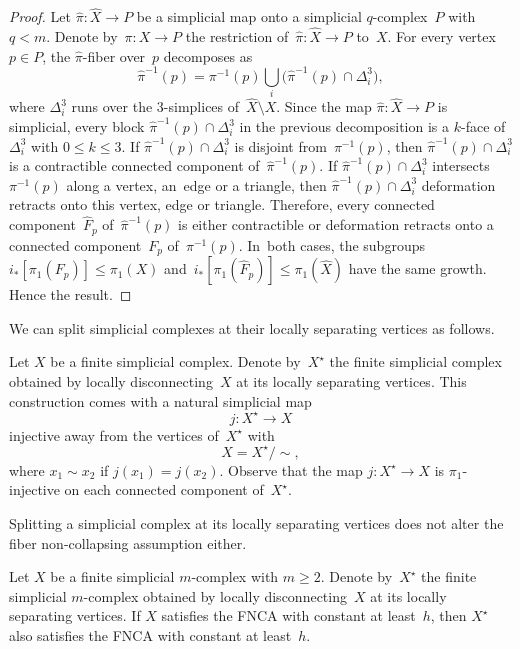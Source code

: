 \begin{proof}
Let $\widehat{\pi}:\widehat{X} \to P$ be a simplicial map onto a simplicial $q$-complex~$P$ with $q < m$.
Denote by~$\pi:X \to P$ the restriction of~$\widehat{\pi}:\widehat{X} \to P$ to~$X$.
For every vertex $p \in P$, the $\widehat{\pi}$-fiber over~$p$ decomposes as
\[
\widehat{\pi}^{-1}(p) = \pi^{-1}(p) \bigcup_i \bigl(\widehat{\pi}^{-1}(p) \cap \Delta_i^3 \bigr),
\]
where $\Delta_i^3$ runs over the $3$-simplices of~$\widehat{X} \setminus X$.
Since the map $\widehat{\pi}:\widehat{X} \to P$ is simplicial, every block $\widehat{\pi}^{-1}(p) \cap \Delta_i^3$ in the previous decomposition is a $k$-face of~$\Delta_i^3$ with \hbox{$0 \leq k \leq 3$}.
If $\widehat{\pi}^{-1}(p) \cap \Delta_i^3$ is disjoint from~$\pi^{-1}(p)$, then $\widehat{\pi}^{-1}(p) \cap \Delta_i^3$ is a contractible connected component of~$\widehat{\pi}^{-1}(p)$.
If $\widehat{\pi}^{-1}(p) \cap \Delta_i^3$ intersects~$\pi^{-1}(p)$ along a vertex, an~edge or a triangle, then $\widehat{\pi}^{-1}(p) \cap \Delta_i^3$ deformation retracts onto this vertex, edge or triangle.
Therefore, every connected component~$\widehat{F}_p$ of~$\widehat{\pi}^{-1}(p)$ is either contractible or deformation retracts onto a connected component~$F_p$ of~$\pi^{-1}(p)$. In~both cases, the subgroups~$i_*[\pi_1(F_p)] \leqslant \pi_1(X)$ and~$i_*[\pi_1(\widehat{F}_p)] \leqslant \pi_1(\widehat{X})$ have the same growth.
Hence the result.
\end{proof}

We can split simplicial complexes at their locally separating vertices as follows.

\begin{definition} \label{def:Xstar}
Let $X$ be a finite simplicial complex.
Denote by~$X^\star$ the finite simplicial complex obtained by locally disconnecting~$X$ at its locally separating vertices.
This construction comes with a natural simplicial map
\begin{equation*}%
j:X^\star \to X
\end{equation*}
injective away from the vertices of~$X^\star$ with
\[
X = X^\star / \! \sim,
\]
where $x_1 \sim x_2$ if $j(x_1)=j(x_2)$.
Observe that the map $j:X^\star \to X$ is $\pi_1$-injective on each connected component of~$X^\star$.
\end{definition}

Splitting a simplicial complex at its locally separating vertices does not alter the fiber non-collapsing assumption either.

\begin{lemma} \label{lem:star}
Let $X$ be a finite simplicial $m$\nobreakdash-complex with $m \geq 2$.
Denote by~$X^\star$ the finite simplicial $m$\nobreakdash-complex obtained by locally disconnecting~$X$ at its locally separating vertices.
If $X$ satisfies the FNCA with constant at least~$h$, then $X^\star$ also satisfies the FNCA with constant at least~$h$.
\end{lemma}

